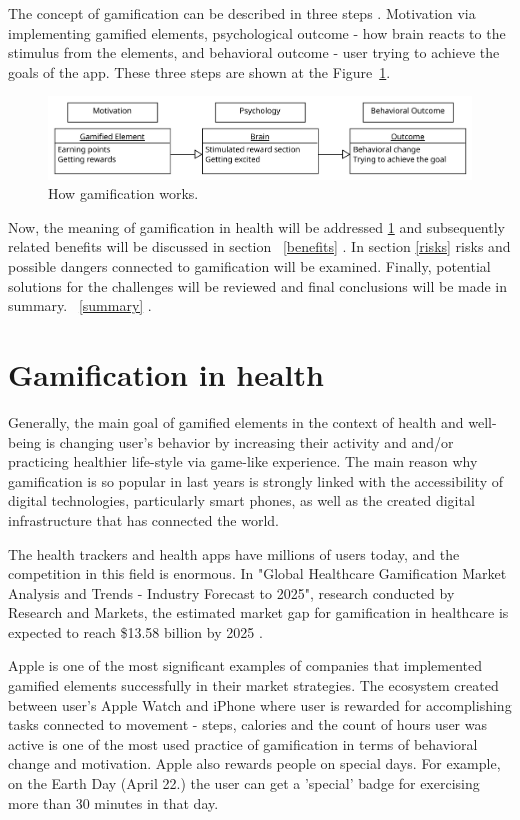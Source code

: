 \documentclass[10pt,twoside,english,a4paper]{article}
\begin{document}
The concept of gamification can be described in three steps \cite{6758978}. Motivation via implementing gamified elements, psychological outcome - how brain reacts to the stimulus from the elements, and behavioral outcome - user trying to achieve the goals of the app. These three steps are shown at the Figure~\ref{f:figure1}.

\begin{figure}[tbh]
\centering
\includegraphics[width=1.0\linewidth]{Figure1.pdf}
\caption{How gamification works.}
\label{f:figure1}
\end{figure}


Now, the meaning of gamification in health will be addressed \ref{G-i-H} and subsequently related benefits will be discussed in section ~\ref{benefits} . In section \ref{risks} risks and possible dangers connected to gamification will be examined. Finally, potential solutions for the challenges will be reviewed and final conclusions will be made  in summary. ~\ref{summary} .

%
%
%

\section{Gamification in health} \label{G-i-H}
Generally, the main goal of gamified elements in the context of health and well-being is changing user's behavior by increasing their activity and and/or practicing healthier life-style via game-like experience. The main reason why gamification is so popular in last years is strongly linked with the accessibility of digital technologies, particularly smart phones, as well as the created digital infrastructure\cite{Ethics} that has connected the world. 

The health trackers and health apps have millions of users today, and the competition in this field is enormous. In "Global Healthcare Gamification Market Analysis and Trends - Industry Forecast to 2025", research conducted by Research and Markets, the estimated market gap for gamification in healthcare is expected to reach \$13.58 billion by 2025 \cite{mgap} .  

Apple is one of the most significant examples of companies that implemented gamified elements successfully in their market strategies. The ecosystem created between user's Apple Watch and iPhone where user is rewarded for accomplishing tasks connected to movement - steps, calories and the count of hours user was active is one of the most used practice \cite{aboveAvalon} of gamification in terms of behavioral change and motivation.  Apple also rewards people on special days. For example, on the Earth Day (April 22.) the user can get a 'special' badge for exercising more than 30 minutes in that day\cite{earthDay}. 
\end{document}
